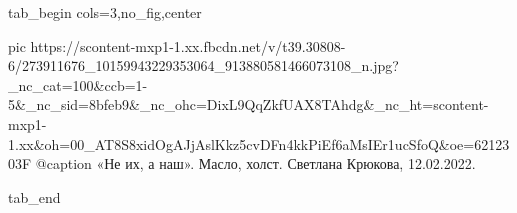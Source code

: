  
 
 
 
 


\ifcmt
  tab_begin cols=3,no_fig,center

     pic https://scontent-mxp1-1.xx.fbcdn.net/v/t39.30808-6/273911676_10159943229353064_913880581466073108_n.jpg?_nc_cat=100&ccb=1-5&_nc_sid=8bfeb9&_nc_ohc=DixL9QqZkfUAX8TAhdg&_nc_ht=scontent-mxp1-1.xx&oh=00_AT8S8xidOgAJjAslKkz5cvDFn4kkPiEf6aMsIEr1ucSfoQ&oe=6212303F
		 @caption «Не их, а наш». Масло, холст. Светлана Крюкова, 12.02.2022.

  tab_end
\fi

